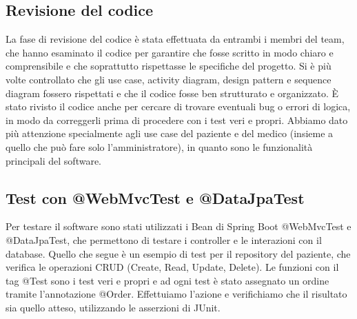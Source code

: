 \documentclass[a4paper]{article}
\begin{document}
\subsection{Revisione del codice}

La fase di revisione del codice è stata effettuata da entrambi i membri del team, che hanno esaminato il codice 
per garantire che fosse scritto in modo chiaro e comprensibile e che soprattutto rispettasse le specifiche 
del progetto. Si è più volte controllato che gli use case, activity diagram, design pattern e sequence diagram 
fossero rispettati e che il codice fosse ben strutturato e organizzato. È stato rivisto il codice anche per 
cercare di trovare eventuali bug o errori di logica, in modo da correggerli prima di procedere con i test veri e propri.
Abbiamo dato più attenzione specialmente agli use case del paziente e del medico (insieme a quello che
può fare solo l'amministratore), in quanto sono le funzionalità principali del software.

\subsection{Test con @WebMvcTest e @DataJpaTest}

Per testare il software sono stati utilizzati i Bean di Spring Boot @WebMvcTest e @DataJpaTest, che permettono di testare i controller 
e le interazioni con il database. Quello che segue 
è un esempio di test per il repository del paziente, che verifica le operazioni CRUD (Create, Read, Update, Delete).
Le funzioni con il tag @Test sono i test veri e propri e ad ogni test è stato assegnato un ordine tramite l'annotazione @Order.
Effettuiamo l'azione e verifichiamo che il risultato sia quello atteso, utilizzando le asserzioni di JUnit.
\end{document}
